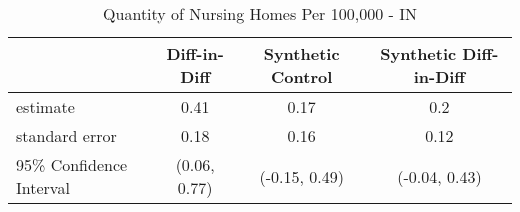 \begin{table}[ht]
\centering
\begin{tabular}{lccc}
  \hline
 & Diff-in-Diff & Synthetic Control & Synthetic Diff-in-Diff \\ 
  \hline
estimate & 0.41 & 0.17 & 0.2 \\ 
  standard error & 0.18 & 0.16 & 0.12 \\ 
  95\% Confidence Interval & (0.06, 0.77) & (-0.15, 0.49) & (-0.04, 0.43) \\ 
   \hline
\end{tabular}
\caption{Quantity of Nursing Homes Per 100,000 - IN} 
\end{table}
